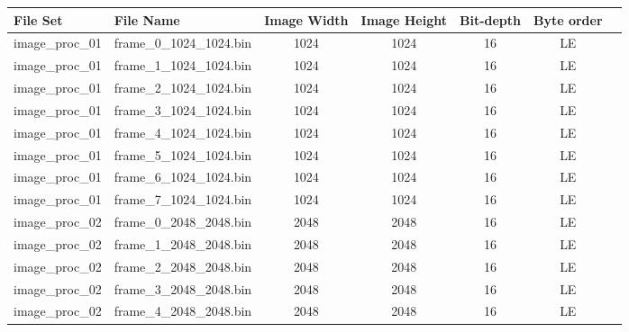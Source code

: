 \begin{table}[!h]
    \begin{tabular}{|l|l|c|c|c|c|c|}
        \hline
        File Set                & File Name                 & Image Width   & Image Height  & Bit-depth     & Byte order    \\ \hline
        \hline
        image\_proc\_01	        & frame\_0\_1024\_1024.bin     & 1024          & 1024          & 16            & LE            \\ \hline
        image\_proc\_01	        & frame\_1\_1024\_1024.bin     & 1024          & 1024          & 16            & LE            \\ \hline
        image\_proc\_01	        & frame\_2\_1024\_1024.bin     & 1024          & 1024          & 16            & LE            \\ \hline
        image\_proc\_01	        & frame\_3\_1024\_1024.bin     & 1024          & 1024          & 16            & LE            \\ \hline
        image\_proc\_01	        & frame\_4\_1024\_1024.bin     & 1024          & 1024          & 16            & LE            \\ \hline
        image\_proc\_01	        & frame\_5\_1024\_1024.bin     & 1024          & 1024          & 16            & LE            \\ \hline
        image\_proc\_01	        & frame\_6\_1024\_1024.bin     & 1024          & 1024          & 16            & LE            \\ \hline
        image\_proc\_01	        & frame\_7\_1024\_1024.bin     & 1024          & 1024          & 16            & LE            \\ \hline
        \hline
        image\_proc\_02	        & frame\_0\_2048\_2048.bin     & 2048          & 2048          & 16            & LE            \\ \hline
        image\_proc\_02	        & frame\_1\_2048\_2048.bin     & 2048          & 2048          & 16            & LE            \\ \hline
        image\_proc\_02	        & frame\_2\_2048\_2048.bin     & 2048          & 2048          & 16            & LE            \\ \hline
        image\_proc\_02	        & frame\_3\_2048\_2048.bin     & 2048          & 2048          & 16            & LE            \\ \hline
        image\_proc\_02	        & frame\_4\_2048\_2048.bin     & 2048          & 2048          & 16            & LE            \\ \hline

\end{tabular}
\end{table}
